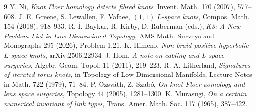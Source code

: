 \documentclass[11pt]{article}
\theoremstyle{definition}
\begin{document}
\begin{thebibliography}{9}
 Y. Ni, \emph{Knot Floer homology detects fibred knots}, Invent. Math. 170 (2007), 577--608.
 J. E. Greene, S. Lewallen, F. Vafaee, \emph{$(1,1)$ $L$-space knots},
Compos. Math. 154 (2018), 918--933.
 R. \.I. Baykur, R. Kirby, D. Ruberman (eds.), \emph{K3: A New Problem List in Low-Dimensional Topology},
AMS Math. Surveys and Monographs 295 (2026), Problem 1.21.
 K. Himeno, \emph{Non-braid positive hyperbolic $L$-space knots}, arXiv:2506.22934.
 J. Hom, \emph{A note on cabling and $L$-space surgeries}, Algebr. Geom. Topol. 11 (2011), 219--223.
 R. A. Litherland, \emph{Signatures of iterated torus knots}, in Topology of Low-Dimensional Manifolds,
Lecture Notes in Math. 722 (1979), 71--84.
 P. Ozsv\'ath, Z. Szab\'o, \emph{On knot Floer homology and lens space surgeries},
Topology 44 (2005), 1281--1300.
 K. Murasugi, \emph{On a certain numerical invariant of link types},
Trans. Amer. Math. Soc. 117 (1965), 387--422.
\end{thebibliography}
\end{document}
